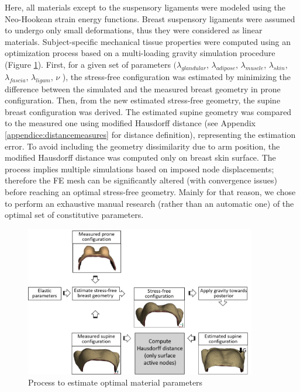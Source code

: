  Here, all materials except to the suspensory ligaments were modeled using the Neo-Hookean strain energy functions. Breast suspensory ligaments were assumed to undergo only small deformations, thus they were considered as linear materials.  Subject-specific mechanical tissue properties were computed using an optimization process based on a multi-loading gravity simulation procedure (Figure \ref{fig:optimizationalgo}). First, for a given set of parameters $(\lambda_{glandular}$, $\lambda_{adipose}$, $ \lambda_{muscle}$,  $\lambda_{skin}$, $\lambda_{fascia}$, $\lambda_{ligam}$, $\nu$ ), the stress-free configuration was estimated by minimizing the difference between the simulated and the measured breast geometry in prone configuration. Then, from the new estimated stress-free geometry, the supine breast configuration was derived. The estimated supine geometry was compared to the measured one using modified Hausdorff distance (see Appendix \ref{appendice:distancemeasures} for distance definition), representing the estimation error.  To avoid including the geometry dissimilarity due to arm position, the modified Hausdorff distance was computed only on breast skin surface.  
The process implies multiple simulations based on imposed node displacements; therefore the FE mesh can be significantly altered (with convergence issues) before reaching an optimal stress-free geometry. Mainly for that reason, we chose to perform an exhaustive manual research (rather than an automatic one) of the optimal set of constitutive parameters. 


\begin{figure}[!h]
\centering
\includegraphics[width=0.9\textwidth,keepaspectratio]{figures/optimizationMaterialParameters.png} 
\caption{Process to estimate optimal material parameters}\label{fig:optimizationalgo}
\end{figure}
 

